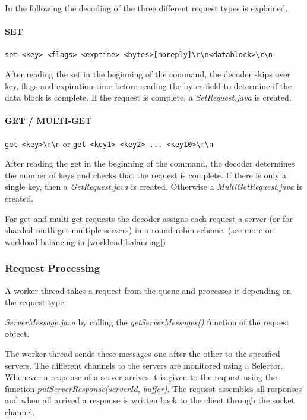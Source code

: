 \documentclass[11pt,a4paper]{article}
\begin{document}
In the following the decoding of the three different request types is explained. 

\paragraph{SET} \texttt{set <key> <flags> <exptime> <bytes>[noreply]\textbackslash r\textbackslash n<datablock>\textbackslash r\textbackslash n} 

After reading the set in the beginning of the command, the decoder skips over key, flags and expiration time before reading the bytes field to determine if the data block is complete. If the request is complete, a \emph{SetRequest.java} is created.

\paragraph{GET / MULTI-GET} \texttt{get <key>\textbackslash r\textbackslash n} or \texttt{get <key1> <key2> ... <key10>\textbackslash r\textbackslash n}

After reading the get in the beginning of the command, the decoder determines the number of keys and checks that the request is complete. If there is only a single key, then a \emph{GetRequest.java} is created. Otherwise a \emph{MultiGetRequest.java} is created.

For get and multi-get requests the decoder assigns each request a server (or for sharded mutli-get multiple servers) in a round-robin scheme. (see more on workload balancing in \ref{workload-balancing})


\subsubsection{Request Processing}\label{request-processing}

A worker-thread takes a request from the queue and processes it depending on the request type.

\emph{ServerMessage.java} by calling the \emph{getServerMessages()} function of the request object.

The worker-thread sends these messages one after the other to the specified servers.
The different channels to the servers are monitored using a Selector. Whenever a response of a server arrives it 
is given to the request using the function \emph{putServerResponse(serverId, buffer)}. The request assembles all responses and when all arrived a response is written back to the client through the socket channel.
\end{document}

